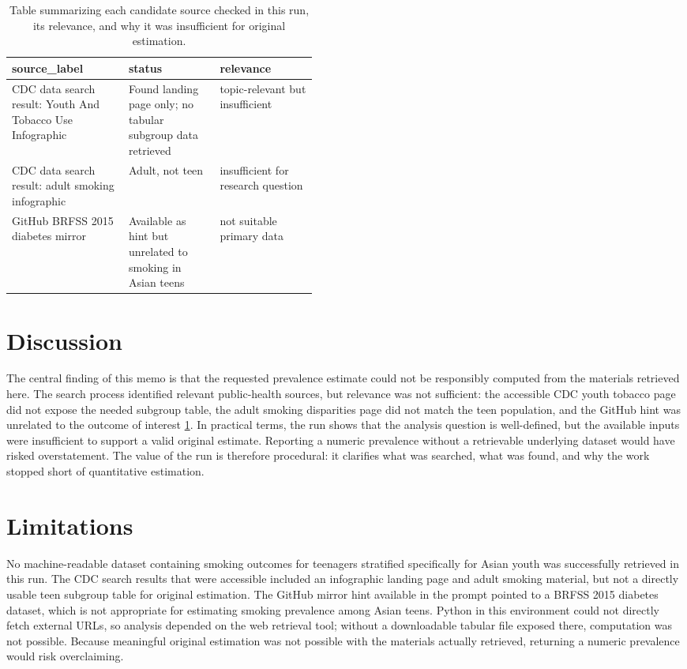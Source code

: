 \documentclass[11pt]{article}
\begin{document}
\begin{table}[tbp]
\centering
\caption{Table summarizing each candidate source checked in this run, its relevance, and why it was insufficient for original estimation.}
\label{tab:artifact-2}
\begin{tabular}{>{\raggedright\arraybackslash}p{0.15\linewidth}>{\raggedright\arraybackslash}p{0.15\linewidth}>{\raggedright\arraybackslash}p{0.15\linewidth}}
\toprule
source\_label & status & relevance \\
\midrule
CDC data search result: Youth And Tobacco Use Infographic & Found landing page only; no tabular subgroup data retrieved & topic-relevant but insufficient \\
CDC data search result: adult smoking infographic & Adult, not teen & insufficient for research question \\
GitHub BRFSS 2015 diabetes mirror & Available as hint but unrelated to smoking in Asian teens & not suitable primary data \\
\bottomrule
\end{tabular}
\end{table}

\section{Discussion}
The central finding of this memo is that the requested prevalence estimate could not be responsibly computed from the materials retrieved here. The search process identified relevant public-health sources, but relevance was not sufficient: the accessible CDC youth tobacco page did not expose the needed subgroup table, the adult smoking disparities page did not match the teen population, and the GitHub hint was unrelated to the outcome of interest \ref{tab:artifact-2}. In practical terms, the run shows that the analysis question is well-defined, but the available inputs were insufficient to support a valid original estimate. Reporting a numeric prevalence without a retrievable underlying dataset would have risked overstatement. The value of the run is therefore procedural: it clarifies what was searched, what was found, and why the work stopped short of quantitative estimation.

\section{Limitations}
No machine-readable dataset containing smoking outcomes for teenagers stratified specifically for Asian youth was successfully retrieved in this run. The CDC search results that were accessible included an infographic landing page and adult smoking material, but not a directly usable teen subgroup table for original estimation. The GitHub mirror hint available in the prompt pointed to a BRFSS 2015 diabetes dataset, which is not appropriate for estimating smoking prevalence among Asian teens. Python in this environment could not directly fetch external URLs, so analysis depended on the web retrieval tool; without a downloadable tabular file exposed there, computation was not possible. Because meaningful original estimation was not possible with the materials actually retrieved, returning a numeric prevalence would risk overclaiming.



\end{document}
